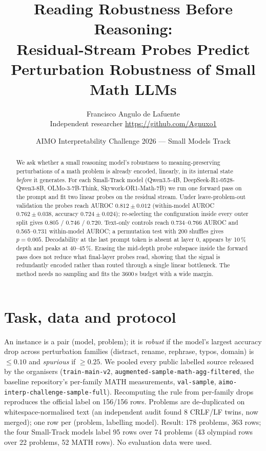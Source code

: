 \documentclass[10pt]{article}
\title{Reading Robustness Before Reasoning:\\Residual-Stream Probes Predict Perturbation Robustness of Small Math LLMs}
\author{Francisco Angulo de Lafuente\\\small Independent researcher \quad \url{https://github.com/Agnuxo1}}
\date{AIMO Interpretability Challenge 2026 --- Small Models Track}
\begin{document}
\maketitle

\begin{abstract}
We ask whether a small reasoning model's robustness to meaning-preserving perturbations of a math problem is already encoded, linearly, in its internal state \emph{before} it generates. For each Small-Track model (Qwen3.5-4B, DeepSeek-R1-0528-Qwen3-8B, OLMo-3-7B-Think, Skywork-OR1-Math-7B) we run one forward pass on the prompt and fit two linear probes on the residual stream. Under leave-problem-out validation the probes reach AUROC $0.812\pm0.012$ (within-model AUROC $0.762\pm0.038$, accuracy $0.724\pm0.024$); re-selecting the configuration inside every outer split gives $0.805$ / $0.746$ / $0.720$. Text-only controls reach 0.734--0.766 AUROC and 0.565--0.731 within-model AUROC; a permutation test with 200 shuffles gives $p=0.005$. Decodability at the last prompt token is absent at layer 0, appears by 10\,\% depth and peaks at 40--45\,\%. Erasing the mid-depth probe subspace inside the forward pass does not reduce what final-layer probes read, showing that the signal is redundantly encoded rather than routed through a single linear bottleneck. The method needs no sampling and fits the 3600\,s budget with a wide margin.
\end{abstract}

\section{Task, data and protocol}
An instance is a pair (model, problem); it is \emph{robust} if the model's largest accuracy drop across perturbation families (distract, rename, rephrase, typos, domain) is $\le0.10$ and \emph{spurious} if $\ge0.25$. We pooled every public labelled source released by the organisers (\texttt{train-main-v2}, \texttt{augmented-sample-math-agg-filtered}, the baseline repository's per-family MATH measurements, \texttt{val-sample}, \texttt{aimo-interp-challenge-sample-full}). Recomputing the rule from per-family drops reproduces the official label on 156/156 rows. Problems are de-duplicated on whitespace-normalised text (an independent audit found 8 CRLF/LF twins, now merged); one row per (problem, labelling model). Result: 178 problems, 363 rows; the four Small-Track models label 95 rows over 74 problems (43 olympiad rows over 22 problems, 52 MATH rows). No evaluation data were used.
\end{document}
